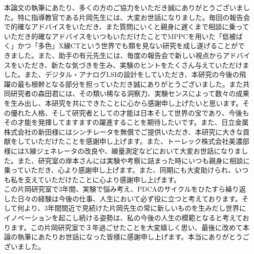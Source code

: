 \begin{acknowledgment}
本論文の執筆にあたり、多くの方のご協力をいただき誠にありがとうございました。特に指導教官である片岡先生には、大変お世話になりました。毎回の報告会で的確なアドバイスをいただき、また質問にいくと親身に遅くまで相談に乗っていただき的確なアドバイスをいつもいただけたことでMPPCを用いた「低被ばく」かつ「多色」X線CTという世界でも類を見ない研究を成し遂げることができました。また、助手の有元先生には、毎度の報告会で新しい視点からアドバイスをいただき、新たな気づきを生み、実験のヒントをたくさん与えていただけました。また、デジタル・アナログLSIの設計をしていただき、本研究の今後の飛躍の最も根幹となる部分を担っていただき誠にありがとうございました。また共同研究者の森田君には、その類い稀なる洞察力、実験センスによって数々の成果を生み出し、本研究を共にできたことに心から感謝申し上げたいと思います。その優れた人格、そして研究者としての才能は日本そして世界の宝であり、今後もその才能を発揮してますますの躍進することを期待したいです。また、日立金属株式会社の新田様にはシンチレータを無償でご提供いただき、本研究に大きな貢献をしていただけたことを感謝申し上げます。また、トーレック株式会社美濃部様にはX線ジェネレータの改良や、線量測定などにおいて大変お世話になりました。また、研究室の岸本さんには実験や考察に詰まった時にいつも親身に相談に乗っていただき、心より感謝申し上げます。また、同期にも大変助けられ、いつも私を支えていただけたことに心より感謝申し上げます。\\この片岡研究室で3年間、実験で悩み考え、PDCAのサイクルをひたすら繰り返した日々の経験は今後の仕事、人生において必ず役に立つと考えております。そして何より、3年間間近で見続けた片岡先生の常に新しいものを生みだし世界にイノベーションを起こし続ける姿勢は、私の今後の人生の模範となると考えております。この片岡研究室で３年過ごせたことを大変嬉しく思い、最後に改めて本論の執筆にあたりお世話になった皆様に感謝申し上げます。本当にありがとうございました。
\end{acknowledgment}
